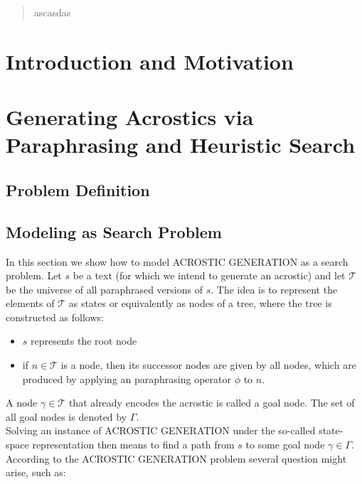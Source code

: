 \documentclass[11pt]{reportAlternative}
\begin{document}
\begin{abstract}
ascasdas
\end{abstract}

\chapter{Introduction and Motivation}
\chapter{Generating Acrostics via Paraphrasing and Heuristic Search}

\section{Problem Definition}




\section{Modeling as Search Problem}
In this section we show how to model ACROSTIC GENERATION as a search problem. Let $s$ be a text (for which we intend to generate an acrostic) and let $\mathcal{T}$ be the universe of all paraphrased versions of $s$. The idea is to represent the elements of $\mathcal{T}$ as states or equivalently as nodes of a tree, where the tree is constructed as follows:
\begin{itemize}
\item $s$ represents the root node

\item if $n\in\mathcal{T}$ is a node, then its successor nodes are given by all nodes, which
are produced by applying an paraphrasing operator $\phi$ to $n$.

\end{itemize}

A node $\gamma\in\mathcal{T}$ that already encodes the acrostic is called a goal node. The set of all goal nodes is denoted by $\Gamma$.\\
Solving an instance of ACROSTIC GENERATION under the so-called state-space representation then means to find a path from $s$ to some goal node $\gamma\in\Gamma$. According to the 
ACROSTIC GENERATION problem several question might arise, such as:
\end{document}
